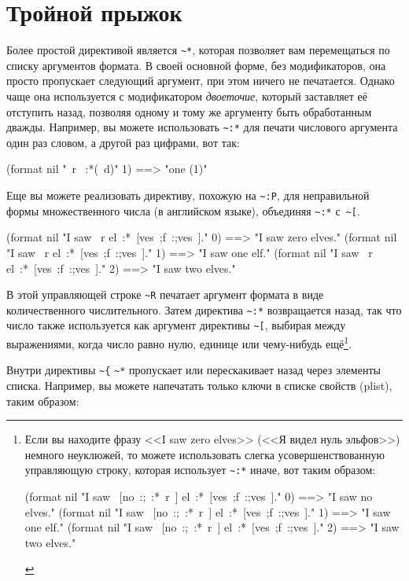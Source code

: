 \section{Тройной прыжок}

Более простой директивой является \lstinline!~*!, которая позволяет вам перемещаться по
списку аргументов формата. В своей основной форме, без модификаторов, она просто
пропускает следующий аргумент, при этом ничего не печатается. Однако чаще она используется
с модификатором \textit{двоеточие}, который заставляет её отступить назад, позволяя одному
и тому же аргументу быть обработанным дважды. Например, вы можете использовать
\lstinline!~:*! для печати числового аргумента один раз словом, а другой раз цифрами, вот
так:

\begin{myverb}
(format nil "~r ~:*(~d)" 1) ==> "one (1)"
\end{myverb}

Еще вы можете реализовать директиву, похожую на \lstinline!~:P!, для неправильной формы множественного числа (в английском
языке), объединяя \lstinline!~:*! с~\lstinline!~[!.

\begin{myverb}
(format nil "I saw ~r el~:*~[ves~;f~:;ves~]." 0) ==> "I saw zero elves."
(format nil "I saw ~r el~:*~[ves~;f~:;ves~]." 1) ==> "I saw one elf."
(format nil "I saw ~r el~:*~[ves~;f~:;ves~]." 2) ==> "I saw two elves."
\end{myverb}

В этой управляющей строке \lstinline!~R! печатает аргумент формата в виде количественного числительного. Затем директива
\lstinline!~:*! возвращается назад, так что число также используется как аргумент директивы \lstinline!~[!, выбирая между
выражениями, когда число равно нулю, единице или чему-нибудь ещё\footnote{Если вы находите фразу <<I saw zero elves>>
(<<Я видел нуль эльфов>>) немного неуклюжей, то можете использовать слегка усовершенствованную управляющую строку,
которая использует \lstinline!~:*! иначе, вот таким образом:

\begin{myverb}
(format nil "I saw ~[no~:;~:*~r~] el~:*~[ves~;f~:;ves~]." 0) ==> "I saw no elves."
(format nil "I saw ~[no~:;~:*~r~] el~:*~[ves~;f~:;ves~]." 1) ==> "I saw one elf."
(format nil "I saw ~[no~:;~:*~r~] el~:*~[ves~;f~:;ves~]." 2) ==> "I saw two elves."
\end{myverb}
}.

Внутри директивы \lstinline!~{! \lstinline!~*! пропускает или перескакивает назад через элементы списка. Например, вы можете
напечатать только ключи в списке свойств (plist), таким образом:

